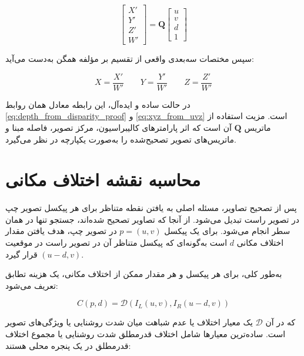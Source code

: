 \begin{equation}
	\begin{bmatrix}
		X' \\
		Y' \\
		Z' \\
		W'
	\end{bmatrix}
	=
	\mathbf{Q}
	\begin{bmatrix}
		u \\
		v \\
		d \\
		1
	\end{bmatrix}
	\label{eq:q_reprojection}
\end{equation}

سپس مختصات سه‌بعدی واقعی از تقسیم بر مؤلفه همگن به‌دست می‌آید:

\begin{equation}
	X = \frac{X'}{W'}
	\qquad
	Y = \frac{Y'}{W'}
	\qquad
	Z = \frac{Z'}{W'}
	\label{eq:q_reprojection_normalized}
\end{equation}

در حالت ساده و ایده‌آل، این رابطه معادل همان روابط \eqref{eq:depth_from_disparity_proof} و \eqref{eq:xyz_from_uvz} است. مزیت استفاده از ماتریس \(\mathbf{Q}\) آن است که اثر پارامترهای کالیبراسیون، مرکز تصویر، فاصله مبنا و ماتریس‌های تصویر تصحیح‌شده را به‌صورت یکپارچه در نظر می‌گیرد.

\section{محاسبه نقشه اختلاف مکانی}

پس از تصحیح تصاویر، مسئله اصلی به یافتن نقطه متناظر برای هر پیکسل تصویر چپ در تصویر راست تبدیل می‌شود. از آنجا که تصاویر تصحیح شده‌اند، جستجو تنها در همان سطر انجام می‌شود. برای یک پیکسل \(p=(u,v)\) در تصویر چپ، هدف یافتن مقدار اختلاف مکانی \(d\) است به‌گونه‌ای که پیکسل متناظر آن در تصویر راست در موقعیت \((u-d,v)\) قرار گیرد.

به‌طور کلی، برای هر پیکسل و هر مقدار ممکن از اختلاف مکانی، یک هزینه تطابق تعریف می‌شود:

\begin{equation}
	C(p,d) =
	\mathcal{D}
	\left(
	I_L(u,v),
	I_R(u-d,v)
	\right)
	\label{eq:matching_cost_general}
\end{equation}

که در آن \(\mathcal{D}\) یک معیار اختلاف یا عدم شباهت میان شدت روشنایی یا ویژگی‌های تصویر است. ساده‌ترین معیارها شامل اختلاف قدرمطلق شدت روشنایی یا مجموع اختلاف قدرمطلق در یک پنجره محلی هستند:


